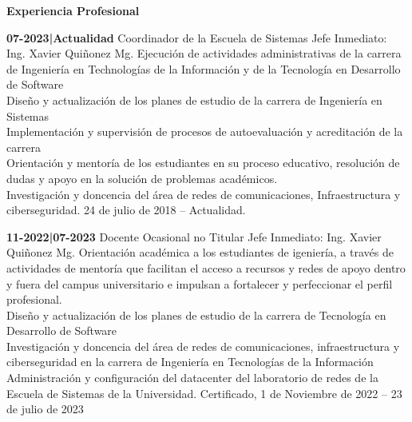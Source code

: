 \pagestyle{empty}

\begin{mainbar}
    \textbf{Experiencia Profesional}
\end{mainbar}


\begin{levent}
    \cvevent
	{\textbf{07-2023|Actualidad}}
	{ Coordinador de la Escuela de Sistemas}
	{Jefe Inmediato: Ing. Xavier Quiñonez Mg.}
	{Ejecución de actividades administrativas de la carrera de Ingeniería en Technologías de la Información y de la Tecnología en Desarrollo de Software\\
	Diseño y actualización de los planes de estudio de la carrera de Ingeniería en Sistemas\\
	Implementación y supervisión de procesos de autoevaluación y acreditación de la carrera\\
	Orientación y mentoría de los estudiantes en su proceso educativo, resolución de  dudas y apoyo en la solución de problemas académicos.\\
	Investigación y doncencia del área de redes de comunicaciones, Infraestructura y ciberseguridad.}
	{24 de julio de 2018 – Actualidad.}
\end{levent}

\begin{devent}
    \cvevent
	{\textbf{11-2022|07-2023}}
	{Docente Ocasional no Titular}
	{Jefe Inmediato: Ing. Xavier Quiñonez Mg.}
	{Orientación académica a los estudiantes de igeniería, a través de actividades de mentoría que
	facilitan el acceso a recursos y redes de apoyo dentro y fuera del campus universitario e impulsan a fortalecer y perfeccionar el perfil profesional.\\
    Diseño y actualización de los planes de estudio de la carrera de Tecnología en Desarrollo de Software\\
    Investigación y doncencia del área de redes de comunicaciones, infraestructura y ciberseguridad en la carrera de Ingeniería en Tecnologías de la Información\\
	Administración y configuración del datacenter del laboratorio de redes de la Escuela de Sistemas de la Universidad.}
	{Certificado,  1 de Noviembre de 2022 – 23 de julio de 2023}
\end{devent}

